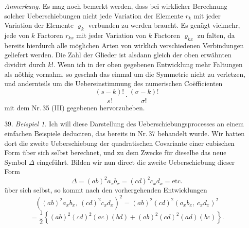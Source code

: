 \documentclass[11pt]{article}
\providecommand{\gesperrt}[1]{\textls[130]{#1}}
\let\Delta\varDelta
\begin{document}
\textit{Anmerkung.} Es mag noch bemerkt werden, dass bei wirklicher
Berechnung solcher Ueberschiebungen nicht jede Variation der Elemente
$r_k$ mit jeder Variation der Elemente $\varrho_k$ verbunden zu werden
braucht. Es genügt vielmehr, jede \gesperrt{Combination} von $k$
Factoren $r_{kx}$ mit jeder Variation von $k$ Factoren $\varrho_{kx}$
zu falten, da bereits hierdurch alle möglichen Arten von wirklich
verschiedenen Verbindungen geliefert werden. Die Zahl der Glieder ist
alsdann gleich der oben erwähnten dividirt durch $k!$. Wenn ich in der
oben gegebenen Entwicklung mehr Faltungen als nöthig vornahm, so
geschah das einmal um die Symmetrie nicht zu verletzen, und
andernteils um die Uebereinstimmung des numerischen Co\"efficienten
\[
\frac{(s-k)!}{s!}\cdot\frac{(\sigma-k)!}{\sigma!}
\]
mit dem Nr.\,35 (III) gegebenen hervorzuheben.

39. \textit{Beispiel 1.} Ich will diese Darstellung des
Ueberschiebungsprocesses an einem einfachen Beispiele deduciren, das
bereits in Nr.\,37 behandelt wurde. Wir hatten dort die zweite
Ueberschiebung der quadratischen Covariante einer cubischen Form über
sich selbst berechnet, und zu dem Zwecke für dieselbe das neue Symbol
$\Delta$ eingeführt. Bilden wir nun direct die zweite Ueberschiebung
dieser Form
\[
\Delta=(ab)^2a_xb_x=(cd)^2c_xd_x=\text{etc.}
\]
über sich selbst, so kommt nach den vorhergehenden Entwicklungen
\[
\left((ab)^2a_xb_x,\ (cd)^2c_xd_x\right)^2=(ab)^2(cd)^2(a_xb_x,\ c_xd_x)^2
\]
\[
=\frac{1}{2}\left\{(ab)^2(cd)^2(ac)(bd)+(ab)^2(cd)^2(ad)(bc)\right\}.
\]
\end{document}
